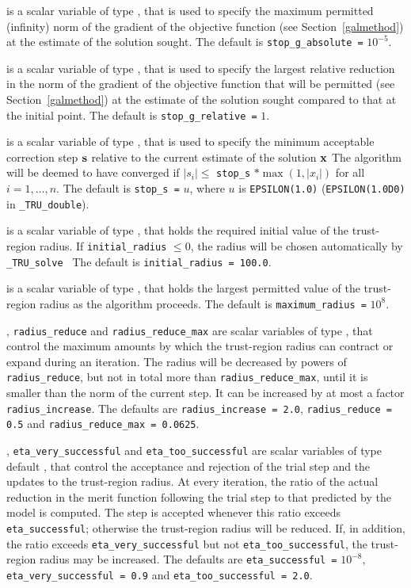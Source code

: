 \documentclass{galahad}
\newcommand{\packagename}{TRU}
\newcommand{\fullpackagename}{\libraryname\_\packagename}
\newcommand{\solver}{{\tt \fullpackagename\_solve}}
\begin{document}
\begin{description}
 is a scalar variable of type \realdp,
that is used to specify the maximum permitted (infinity)
norm of the gradient of the objective function
(see Section~\ref{galmethod}) at the estimate of the solution sought.
The default is {\tt stop\_g\_absolute =} $10^{-5}$.

 is a scalar variable of type \realdp,
that is used to specify the largest relative reduction in the norm of the
gradient of the objective function that will be permitted
(see Section~\ref{galmethod}) at the estimate of the solution sought
compared to that at the initial point.
The default is {\tt stop\_g\_relative =} $1$.

 is a scalar variable of type \realdp,
that is used to specify the minimum acceptable correction step ${\mathbf{s}}$
relative to the current estimate of the solution ${\mathbf{x}}$
The algorithm will be deemed to have converged if $|s_i| \leq$
{\tt stop\_s} $\ast \max( 1, |x_i|)$ for all $i = 1, \ldots, n$.
The default is {\tt stop\_s =} $u$,
where $u$ is {\tt EPSILON(1.0)} ({\tt EPSILON(1.0D0)} in
{\tt \fullpackagename\_double}).

 is a scalar variable of type \realdp, that holds
the required initial value of the trust-region radius. If
{\tt initial\_radius} $\leq 0$, the radius will be chosen automatically
by \solver\
The default is {\tt initial\_radius = 100.0}.

 is a scalar variable of type \realdp, that holds
the largest permitted value of the trust-region radius as the algorithm
proceeds.
The default is {\tt maximum\_radius =} $10^8$.

,
{\tt radius\_reduce} and
{\tt radius\_reduce\_max}
are scalar variables of type \realdp, that
control the maximum amounts by which the trust-region radius can
contract or expand during an iteration. The radius will be decreased by
powers of {\tt radius\_reduce}, but not in total
more than  {\tt radius\_reduce\_max}, until it is smaller than the norm of
the current step.
It can be increased by at most a factor {\tt radius\_increase}.
The defaults are
{\tt radius\_increase = 2.0},
{\tt radius\_reduce = 0.5} and
{\tt radius\_reduce\_max = 0.0625}.

, {\tt eta\_very\_successful}
and {\tt eta\_too\_successful}
are scalar variables of type default
\realdp, that control the acceptance and rejection of the trial step
and the updates to the trust-region radius.
At every iteration, the ratio of the actual reduction in the merit function
following the trial step to that predicted by the model is computed.
The step is accepted whenever this ratio exceeds {\tt eta\_successful};
otherwise the trust-region radius will be reduced.
If, in addition, the ratio exceeds {\tt eta\_very\_successful} but not
{\tt eta\_too\_successful}, the trust-region radius may be increased.
The defaults are
{\tt eta\_successful =} $10^{-8}$,
{\tt eta\_very\_successful = 0.9} and
{\tt eta\_too\_successful = 2.0}.


\end{description}
\end{document}
